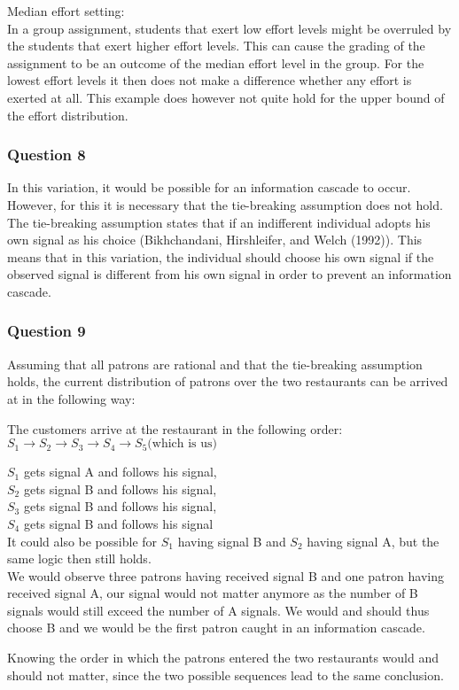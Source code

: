 \documentclass[a4paper]{article}
\begin{document}
\begin{enumerate}[(a)]
Median effort setting:\\
In a group assignment, students that exert low effort levels might be overruled by the students that exert higher effort levels. This can cause the grading of the assignment to be an outcome of the median effort level in the group. For the lowest effort levels it then does not make a difference whether any effort is exerted at all. This example does however not quite hold for the upper bound of the effort distribution.
\end{enumerate}
\subsubsection{Question 8}

In this variation, it would be possible for an information cascade to occur. However, for this it is necessary that the tie-breaking assumption does not hold. The tie-breaking assumption states that if an indifferent individual adopts his own signal as his choice (Bikhchandani, Hirshleifer, and Welch (1992)). This means that in this variation, the individual should choose his own signal if the observed signal is different from his own signal in order to prevent an information cascade.

\subsubsection{Question 9}

Assuming that all patrons are rational and that the tie-breaking assumption holds, the current distribution of patrons over the two restaurants can be arrived at in the following way:

The customers arrive at the restaurant in the following order:\\ $S_1\rightarrow S_2 \rightarrow S_3 \rightarrow S_4 \rightarrow S_5 \text{(which is us)}$

$S_1$ gets signal A and follows his signal,\\
$S_2$ gets signal B and follows his signal,\\
$S_3$ gets signal B and follows his signal,\\
$S_4$ gets signal B and follows his signal\\

It could also be possible for $S_1$ having signal B and $S_2$ having signal A, but the same logic then still holds.\\

We would observe three patrons having received signal B and one patron having received signal A, our signal would not matter anymore as the number of B signals would still exceed the number of A signals. We would and should thus choose B and we would be the first patron caught in an information cascade. 

Knowing the order in which the patrons entered the two restaurants would and should not matter, since the two possible sequences lead to the same conclusion.
\end{document}
